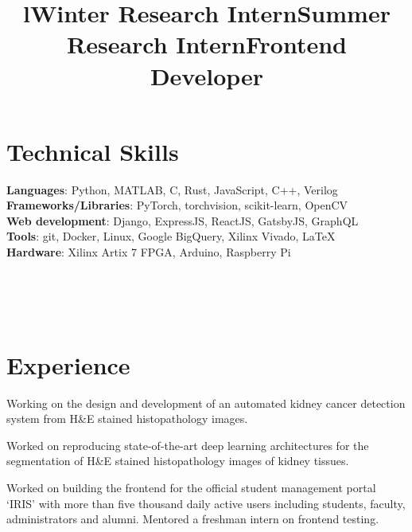 \documentclass[margin]{res}
\begin{document}
\begin{resume}
    \section{Technical Skills}
      \textbf{Languages}: Python, MATLAB, C, Rust, JavaScript, C++, Verilog
      \\
      \textbf{Frameworks/Libraries}: PyTorch, torchvision, scikit-learn, OpenCV
      \\
      \textbf{Web development}: Django, ExpressJS, ReactJS, GatsbyJS, GraphQL
      \\
      \textbf{Tools}: git, Docker, Linux, Google BigQuery, Xilinx Vivado, \LaTeX
      \\
      \textbf{Hardware}: Xilinx Artix 7 FPGA, Arduino, Raspberry Pi


    \begin{format}
      \title{l}\\
      \\
      \body\\
    \end{format}

    \section{Experience}
      \title{\textbf{Winter Research Intern}}
      \begin{position}
        Working on the design and development of an automated kidney cancer detection system from H\&E stained histopathology images.
      \end{position}

      \title{\textbf{Summer Research Intern}}
      \begin{position}
          Worked on reproducing state-of-the-art deep learning architectures for the segmentation of H\&E stained histopathology images of kidney tissues.
      \end{position}

      \title{\textbf{Frontend Developer}}
      \begin{position}
        Worked on building the frontend for the official student management portal `IRIS' with more than five thousand daily active users including students, faculty, administrators and alumni.
        Mentored a freshman intern on frontend testing.
      \end{position}


\end{resume}
\end{document}
